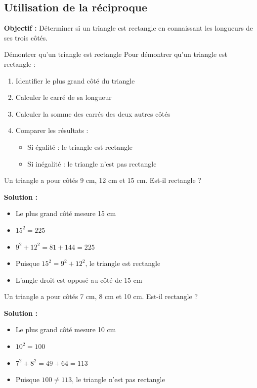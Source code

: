 \subsection{Utilisation de la réciproque}

\textbf{Objectif :} Déterminer si un triangle est rectangle en connaissant les longueurs de ses trois côtés.

\begin{methode}{Démontrer qu'un triangle est rectangle}
Pour démontrer qu'un triangle est rectangle :
\begin{enumerate}
    \item Identifier le plus grand côté du triangle
    \item Calculer le carré de sa longueur
    \item Calculer la somme des carrés des deux autres côtés
    \item Comparer les résultats :
    \begin{itemize}
        \item Si égalité : le triangle est rectangle
        \item Si inégalité : le triangle n'est pas rectangle
    \end{itemize}
\end{enumerate}
\end{methode}

\begin{exemple}
Un triangle a pour côtés 9 cm, 12 cm et 15 cm. Est-il rectangle ?

\textbf{Solution :}
\begin{itemize}
    \item Le plus grand côté mesure 15 cm
    \item $15^2 = 225$
    \item $9^2 + 12^2 = 81 + 144 = 225$
    \item Puisque $15^2 = 9^2 + 12^2$, le triangle est rectangle
    \item L'angle droit est opposé au côté de 15 cm
\end{itemize}
\end{exemple}

\begin{exemple}
Un triangle a pour côtés 7 cm, 8 cm et 10 cm. Est-il rectangle ?

\textbf{Solution :}
\begin{itemize}
    \item Le plus grand côté mesure 10 cm
    \item $10^2 = 100$
    \item $7^2 + 8^2 = 49 + 64 = 113$
    \item Puisque $100 \neq 113$, le triangle n'est pas rectangle
\end{itemize}
\end{exemple}

